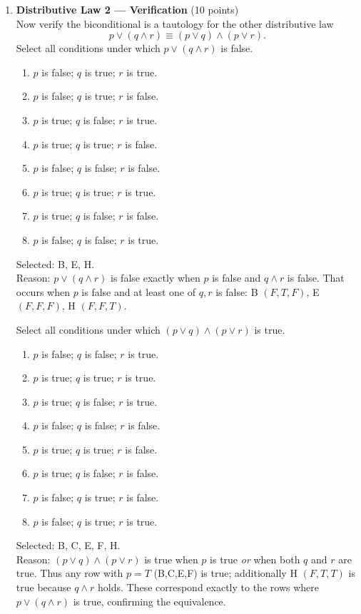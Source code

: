 \begin{enumerate}
  \newpage
  \item \textbf{Distributive Law 2 --- Verification} (10 points)\\
  Now verify the biconditional is a tautology for the other distributive law
  \[
    p \vee (q \wedge r) \equiv (p \vee q) \wedge (p \vee r).
  \]
  Select all conditions under which $p \vee (q \wedge r)$ is false.
  \begin{enumerate}[label=\Alph*.]
    \item $p$ is false; $q$ is true; $r$ is true.
    \item $p$ is false; $q$ is true; $r$ is false.
    \item $p$ is true; $q$ is false; $r$ is true.
    \item $p$ is true; $q$ is true; $r$ is false.
    \item $p$ is false; $q$ is false; $r$ is false.
    \item $p$ is true; $q$ is true; $r$ is true.
    \item $p$ is true; $q$ is false; $r$ is false.
    \item $p$ is false; $q$ is false; $r$ is true.
  \end{enumerate}
  \begin{subanswer}
    Selected: B, E, H. \\
    Reason: $p \vee (q\wedge r)$ is false exactly when $p$ is false and $q\wedge r$ is false. That occurs when $p$ is false and at least one of $q,r$ is false: B $(F,T,F)$, E $(F,F,F)$, H $(F,F,T)$.
  \end{subanswer}

  Select all conditions under which $(p \vee q) \wedge (p \vee r)$ is true.
  \begin{enumerate}[label=\Alph*.]
    \item $p$ is false; $q$ is false; $r$ is true.
    \item $p$ is true; $q$ is true; $r$ is true.
    \item $p$ is true; $q$ is false; $r$ is true.
    \item $p$ is false; $q$ is false; $r$ is false.
    \item $p$ is true; $q$ is true; $r$ is false.
    \item $p$ is true; $q$ is false; $r$ is false.
    \item $p$ is false; $q$ is true; $r$ is false.
    \item $p$ is false; $q$ is true; $r$ is true.
  \end{enumerate}
  \begin{subanswer}
    Selected: B, C, E, F, H. \\
    Reason: $(p\vee q)\wedge(p\vee r)$ is true when $p$ is true \emph{or} when both $q$ and $r$ are true. Thus any row with $p=T$ (B,C,E,F) is true; additionally H $(F,T,T)$ is true because $q\wedge r$ holds. These correspond exactly to the rows where $p\vee(q\wedge r)$ is true, confirming the equivalence.
  \end{subanswer}



\end{enumerate}
